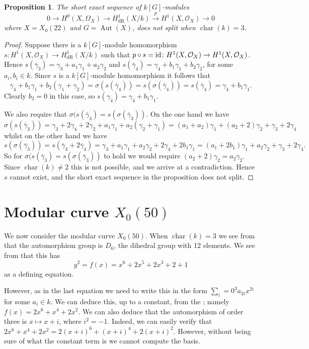 \documentclass[draft, 11pt]{article} %
\theoremstyle{plain}
\newtheorem{prop}[defn]{Proposition}
\theoremstyle{remark}
\newcommand{\ra}{\rightarrow}
\newcommand{\hzero}{{H^0(X,\Omega_X)}}
\newcommand{\hone}{H^1(X,\mathcal{O}_X)}
\newcommand{\derhamhone}{H_{\text {dR}}^1(X/k)}
\DeclareMathOperator{\aut}{Aut}
\DeclareMathOperator{\cha}{char}
\begin{document}
\begin{prop}
The short exact sequence of $k[G]$-modules
\begin{equation*}
0 \ra \hzero \ra \derhamhone \xrightarrow{p} \hone \ra 0
\end{equation*}
where $X = X_0(22)$ and $G = \aut(X)$, does not split when $\cha(k) = 3$.
\end{prop}
\begin{proof}
Suppose there is a $k[G]$-module homomorphism $s\colon \hone \ra \derhamhone$ such that $p \circ s  = {\rm id} \colon \hone \ra \hone$.
Hence $s(\bar \gamma_3) = \gamma_3 + a_1 \gamma_1 + a_2 \gamma_2$ and $s(\bar \gamma_4) = \gamma_4 + b_1 \gamma_1 + b_2 \gamma_2$, for some $a_i, b_i \in k$.
Since $s$ is a $k[G]$-module homomorphism it follows that
\[
\gamma_4 + b_1\gamma_1 + b_2(\gamma_1 + \gamma_2) = \sigma (s(\bar \gamma_4)) = s ( \sigma(\bar \gamma_4)) =  s(\bar \gamma_4) = \gamma_4 + b_1\gamma_1.
\]
Clearly $b_2 = 0$ in this case, so $s(\gamma_4 ) = \gamma_4 + b_1 \gamma_1$.

We also require that $\sigma(s(\bar \gamma_3) = s (\sigma(\bar \gamma_3))$.
On the one hand we have
\[
\sigma(s(\bar \gamma_3)) = \gamma_3 + 2\gamma_4 + 2\gamma_2 + a_1\gamma_1 + a_2(\gamma_2 + \gamma_1) = (a_1 +a_2)\gamma_1 + (a_2 + 2)\gamma_2 + \gamma_3 + 2\gamma_4
\]
whilst on the other hand we have
\[
s(\sigma( \bar \gamma_3)) = s(\bar \gamma_3 + 2 \bar \gamma_4) = \gamma_3 + a_1 \gamma_1 + a_2 \gamma_2 + 2\gamma_4 + 2b_1\gamma_1 = (a_1 + 2b_1)\gamma_1 + a_2\gamma_2 + \gamma_3 + 2\gamma_4.
\]
So for $\sigma(s(\bar \gamma_3) = s (\sigma(\bar \gamma_3))$ to hold we would require $(a_2 + 2)\gamma_2 = a_2\gamma_2$.
Since $\cha(k) \neq 2$ this is not possible, and we arrive at a contradiction.
Hence $s$ cannot exist, and the short exact sequence in the proposition does not split.
\end{proof}



\section{Modular curve $X_0(50)$}
We now consider the modular curve $X_0(50)$.
When $\cha(k) = 3$ we see from \cite[Table 1]{automorphismshyperellipticmodular} that the automorphism group is $D_6$, the dihedral group with 12 elements.
We see from \cite[Table 2]{automorphismshyperellipticmodular} that this has 
\[
y^2 = f(x) = x^6 + 2x^5 + 2x^3 + 2 + 1
\]
as a defining equation.

However, as in the last equation we need to write this in the form $\sum_i=0^3 a_{2i}x^{2i}$ for some $a_i \in k$.
We can deduce this, up to a constant, from the \cite[Table 7]{automorphismshyperellipticmodular}; namely $f(x) = 2x^6 + x^4 +2x^2$.
We can also deduce that the automorphism of order three is $x \mapsto x+i$, where $i^2 = -1$.
Indeed, we can easily verify that $2x^6 + x^4 + 2x^2 = 2(x+i)^6 + (x+i)^4 + 2(x+i)^2$.
However, without being sure of what the constant term is we cannot compute the basis.
\end{document}
